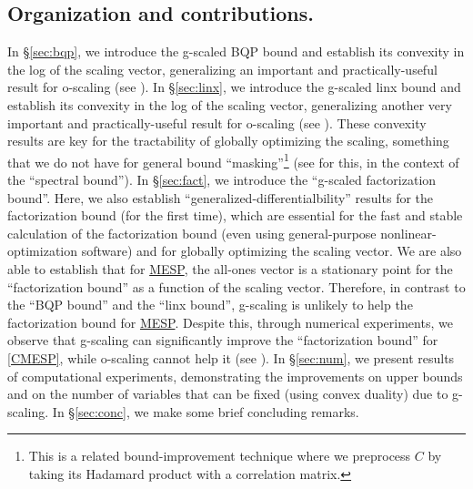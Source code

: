 \documentclass[smallextended]{svjour3hack}       %
\newcommand{\zc}[1]{\noindent{\color{red}[Zhongzhu:]\ {#1}}}
\begin{document}
\subsection{Organization and contributions.}
In \S\ref{sec:bqp}, we introduce the g-scaled
BQP bound and establish its convexity in the log of the scaling vector,
generalizing an important and practically-useful result for o-scaling (see \cite[Theorem 11]{chen_mixing}).
In \S\ref{sec:linx}, we introduce the g-scaled
linx bound and establish its convexity in the log of the scaling vector,
generalizing another very important and practically-useful
result for o-scaling (see \cite[Theorem 18]{chen_mixing}).
These convexity results are key
for the tractability of globally optimizing the scaling, something that we
do not have for general  bound ``masking''\footnote{This is a related bound-improvement  technique where we preprocess $C$ by taking its Hadamard product with a correlation matrix.} (see \cite{AnstreicherLee_Masked,BurerLee} for this, in the context of the ``spectral bound'').
In \S\ref{sec:fact}, we introduce the ``g-scaled
factorization bound''. Here,  we also establish ``generalized-differentialbility'' results for the factorization bound (for the first time), which are essential for the fast and stable calculation of the factorization bound (even using general-purpose nonlinear-optimization software) and for globally optimizing the scaling vector.
 We are also able to establish that
for \hyperlink{MESP}{MESP}, the all-ones vector is a stationary
point for the ``factorization bound'' as a function of the scaling vector. Therefore,
in contrast to the ``BQP bound'' and the ``linx bound'', g-scaling is unlikely to help the factorization bound for \hyperlink{MESP}{MESP}.
Despite this, through numerical experiments, we observe that g-scaling can significantly improve the ``factorization bound'' for \ref{CMESP},
while o-scaling cannot help it (see \cite[Theorem 2.1]{chen2023computing}).
%
In \S\ref{sec:num}, we present results of computational experiments, demonstrating the improvements on upper bounds
and on the number of variables that can be fixed (using convex duality)
due to g-scaling.
In \S\ref{sec:conc}, we make some brief concluding remarks.
\end{document}
